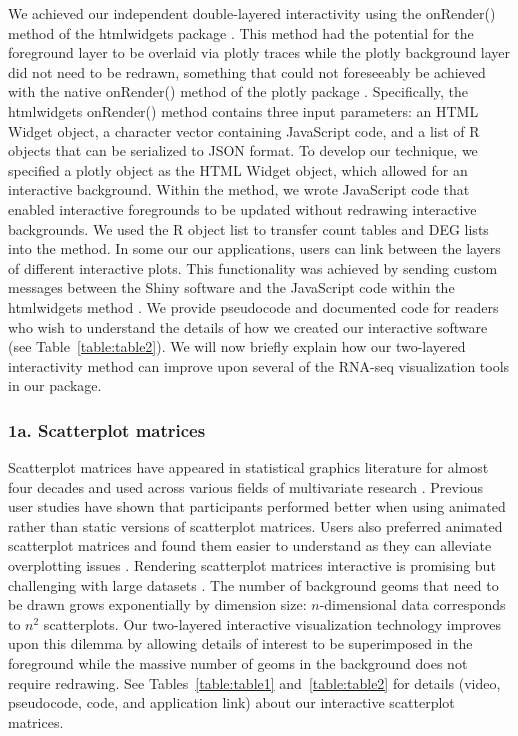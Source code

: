 \documentclass[parskip=full]{bmcart} %
\begin{document}
We achieved our independent double-layered interactivity using the onRender() method of the htmlwidgets package \cite{htmlwidgets}. This method had the potential for the foreground layer to be overlaid via plotly traces while the plotly background layer did not need to be redrawn, something that could not foreseeably be achieved with the native onRender() method of the plotly package \cite{plotly}. Specifically, the htmlwidgets onRender() method contains three input parameters: an HTML Widget object, a character vector containing JavaScript code, and a list of R objects that can be serialized to JSON format. To develop our technique, we specified a plotly object as the HTML Widget object, which allowed for an interactive background. Within the method, we wrote JavaScript code that enabled interactive foregrounds to be updated without redrawing interactive backgrounds. We used the R object list to transfer count tables and DEG lists into the method. In some our our applications, users can link between the layers of different interactive plots. This functionality was achieved by sending custom messages between the Shiny software and the JavaScript code within the htmlwidgets method \cite{shiny}. We provide pseudocode and documented code for readers who wish to understand the details of how we created our interactive software (see Table~\ref{table:table2}). We will now briefly explain how our two-layered interactivity method can improve upon several of the RNA-seq visualization tools in our package. 

\subsubsection*{1a. Scatterplot matrices}

Scatterplot matrices have appeared in statistical graphics literature for almost four decades and used across various fields of multivariate research \cite{becker1984brushing, carr1984graphical, tufte2001visual, tukey1981graphical}. Previous user studies have shown that participants performed better when using animated rather than static versions of scatterplot matrices. Users also preferred animated scatterplot matrices and found them easier to understand as they can alleviate overplotting issues \cite{chen2018using}. Rendering scatterplot matrices interactive is promising but challenging with large datasets \cite{carr1987scatterplot}. The number of background geoms that need to be drawn grows exponentially by dimension size: $n$-dimensional data corresponds to $n^2$ scatterplots. Our two-layered interactive visualization technology improves upon this dilemma by allowing details of interest to be superimposed in the foreground while the massive number of geoms in the background does not require redrawing. See Tables~\ref{table:table1} and~\ref{table:table2} for details (video, pseudocode, code, and application link) about our interactive scatterplot matrices.
\end{document}
